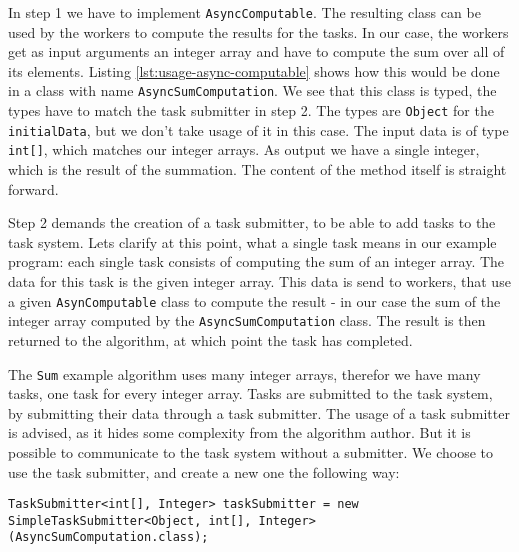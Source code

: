   In step 1 we have to implement \texttt{AsyncComputable}. The resulting class can be used by the workers to compute the results for the tasks. In our case, the workers get as input arguments an integer array and have to compute the sum over all of its elements. Listing \ref{lst:usage-async-computable} shows how this would be done in a class with name \texttt{AsyncSumComputation}. We see that this class is typed, the types have to match the task submitter in step 2. The types are \texttt{Object} for the \texttt{initialData}, but we don't take usage of it in this case. The input data is of type \texttt{int[]}, which matches our integer arrays. As output we have a single integer, which is the result of the summation. The content of the method itself is straight forward.
  
  
  
  Step 2 demands the creation of a task submitter, to be able to add tasks to the task system. Lets clarify at this point, what a single task means in our example program: each single task consists of computing the sum of an integer array. The data for this task is the given integer array. This data is send to workers, that use a given \texttt{AsynComputable} class to compute the result - in our case the sum of the integer array computed by the \texttt{AsyncSumComputation} class. The result is then returned to the algorithm, at which point the task has completed.
  
  The \texttt{Sum} example algorithm uses many integer arrays, therefor we have many tasks, one task for every integer array. Tasks are submitted to the task system, by submitting their data through a task submitter. The usage of a task submitter is advised, as it hides some complexity from the algorithm author. But it is possible to communicate to the task system without a submitter. We choose to use the task submitter, and create a new one the following way:
  
  \begin{lstlisting}
TaskSubmitter<int[], Integer> taskSubmitter = new SimpleTaskSubmitter<Object, int[], Integer>(AsyncSumComputation.class);
  \end{lstlisting}
  
